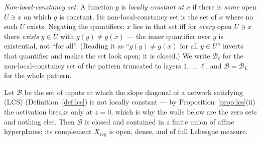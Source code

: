 \begin{clarifybox}
\emph{Non-local-constancy set.} A function $g$ is \emph{locally constant at}
$x$ if there is \emph{some} open $U\ni x$ on which $g$ is constant. Its
non-local-constancy set is the set of $x$ where no such $U$ exists. Negating
the quantifiers: $x$ lies in that set iff for \emph{every} open $U\ni x$ there
\emph{exists} $y\in U$ with $g(y)\neq g(x)$ --- the inner quantifier over $y$
is existential, not ``for all''. (Reading it as ``$g(y)\neq g(x)$ for all
$y\in U$'' inverts that quantifier and makes the set look open; it is closed.) We write
$\mathcal B_\ell$ for the non-local-constancy set of the pattern truncated to
layers $1,\dots,\ell$, and $\mathcal B=\mathcal B_L$ for the whole pattern.
\end{clarifybox}

\begin{lemma}\label{lem:null}
Let $\mathcal B$ be the set of inputs at which the slope diagonal of a network
satisfying (LCS) (Definition~\ref{def:lcs}) is not locally constant --- by
Proposition~\ref{prop:lcs}(ii) the activation breaks only at $z=0$, which is why
the walls below are the zero sets and nothing else. Then $\mathcal B$ is closed and contained in
a finite union of affine hyperplanes; its complement $X_{\mathrm{reg}}$ is
open, dense, and of full Lebesgue measure.
\end{lemma}

